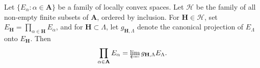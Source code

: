 Let $\{E_\alpha: \alpha \in \mathbf{A}\}$ be a family of locally convex spaces. Let $\mathcal{H}$ be the family of all non-empty finite subsets of $\mathbf{A}$, ordered by inclusion. For $\mathbf{H} \in \mathcal{H}$, set $E_{\mathbf{H}} = \prod_{\alpha \in \mathbf{H}} E_\alpha$, and for $\mathbf{H} \subset \Lambda$, let $g_{\mathbf{H}, \Lambda}$ denote the canonical projection of $E_\Lambda$ onto $E_{\mathbf{H}}$. Then
$$\prod_{\alpha \in \mathbf{A}} E_\alpha = \varprojlim g_{\mathbf{H}, \Lambda} E_\Lambda.$$
